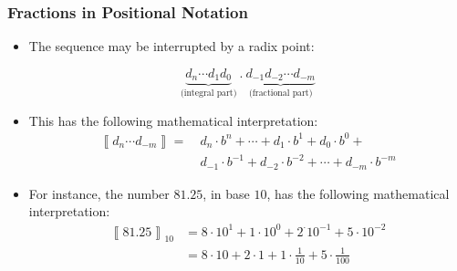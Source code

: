 \begin{frame}

\frametitle{Fractions in Positional Notation}

\begin{itemize}

\item The sequence may be interrupted by a radix point:

\[
\underbrace{d_n \cdots d_1 d_0}_{\text{(integral part)}}~.~\underbrace{d_{-1}
d_{-2} \cdots d_{-m}}_{\text{(fractional part)}}
\]

\item This has the following mathematical interpretation:\begin{align*}
\left\llbracket d_n \cdots d_{-m} \right\rrbracket =&~d_n \cdot b^n + \cdots +
d_1 \cdot b^1 + d_0 \cdot b^0 +\\
&~d_{-1} \cdot b^{-1} + d_{-2} \cdot b^{-2} + \cdots + d_{-m} \cdot b^{-m}
\end{align*}

\item For instance, the number $81.25$, in base $10$, has the following
mathematical interpretation:\begin{align*}
\left\llbracket 81.25 \right\rrbracket_{10} &=
8 \cdot 10^1 + 1 \cdot 10^0 + 2^\cdot 10^{-1} + 5 \cdot 10^{-2} \\
&= 8\cdot 10 + 2 \cdot 1 + 1 \cdot \frac{1}{10} + 5 \cdot \frac{1}{100}
\end{align*}

\end{itemize}

\end{frame}

